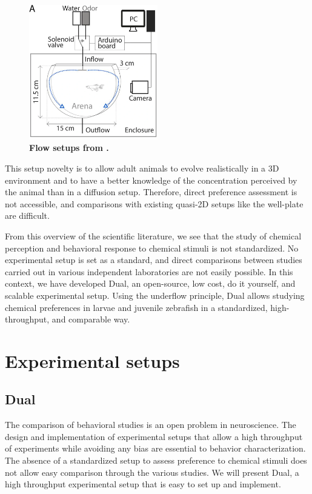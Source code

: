     \begin{figure}[h]
      \centering
      \includegraphics[width=0.5\textwidth]{part_2/assets/flow_1.png}
      \caption{\textbf{Flow setups from \cite{kermen2020stimulus}.}}
      \label{flow_1_setup}
    \end{figure}

    This setup novelty is to allow adult animals to evolve realistically in a 3D environment and to have a better knowledge of the concentration perceived by the animal than in a diffusion setup. Therefore, direct preference assessment is not accessible, and comparisons with existing quasi-2D setups like the well-plate are difficult.

    From this overview of the scientific literature, we see that the study of chemical perception and behavioral response to chemical stimuli is not standardized. No experimental setup is set as a standard, and direct comparisons between studies carried out in various independent laboratories are not easily possible. In this context, we have developed Dual, an open-source, low cost, do it yourself, and scalable experimental setup. Using the underflow principle, Dual allows studying chemical preferences in larvae and juvenile zebrafish in a standardized, high-throughput, and comparable way.

\chapter{Experimental setups}

  \section{Dual}
  The comparison of behavioral studies is an open problem in neuroscience. The design and implementation of experimental setups that allow a high throughput of experiments while avoiding any bias are essential to behavior characterization. The absence of a standardized setup to assess preference to chemical stimuli does not allow easy comparison through the various studies. We will present Dual, a high throughput experimental setup that is easy to set up and implement.

